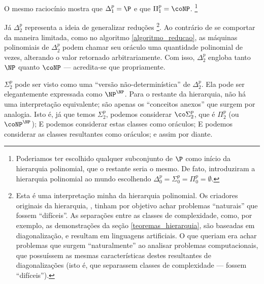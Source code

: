 O mesmo raciocínio mostra que $\Delta_1^p = \P$
e que $\Pi_1^p = \coNP$.
\footnote{
    Poderiamos ter escolhido qualquer subconjunto de $\P$
    como início da hierarquia polinomial,
    que o restante seria o mesmo.
    De fato, 
    introduziram a hierarquia polinomial ao mundo
    escolhendo $\Delta_0^p = \Sigma_0^p = \Pi_0^p = \emptyset$.
}

Já $\Delta_2^p$ representa a ideia de generalizar reduções%
\footnote{
    Esta é uma interpretação minha da hierarquia polinomial.
    Os criadores originais da hierarquia,
    ,
    tinham por objetivo achar problemas ``naturais''
    que fossem ``difíceis''.
    As separações entre as classes de complexidade,
    como, por exemplo, as demonstrações da seção \ref{teoremas_hierarquia},
    são baseadas em diagonalização,
    e resultam em linguagens artificiais.
    O que  queriam
    era achar problemas que surgem ``naturalmente''
    ao analisar problemas computacionais,
    que possuíssem as mesmas características
    destes resultantes de diagonalizações
    (isto é, que separassem classes de complexidade
    --- fossem ``difíceis'').
}.
Ao contrário de se comportar da maneira limitada,
como no algoritmo \ref{algoritmo_reducao},
as máquinas polinomiais de $\Delta_2^p$
podem chamar seu oráculo uma quantidade polinomial de vezes,
alterando o valor retornado arbitrariamente.
Com isso, $\Delta_2^p$ engloba tanto $\NP$ quanto $\coNP$
--- acredita-se que propriamente.

$\Sigma_2^p$ pode ser visto como uma ``versão não-determinística'' de $\Delta_2^p$.
Ela pode ser elegantemente expressada como $\NP^\NP$.
Para o restante da hierarquia,
não há uma interpretação equivalente;
são apenas os ``conceitos anexos'' que surgem por analogia.
Isto é, já que temos $\Sigma_2^p$,
podemos considerar $\co \Sigma_2^p$, que é $\Pi_2^p$
(ou $\coNP^\NP$);
E podemos considerar estas classes como oráculos;
E podemos considerar as classes resultantes como oráculos;
e assim por diante.
